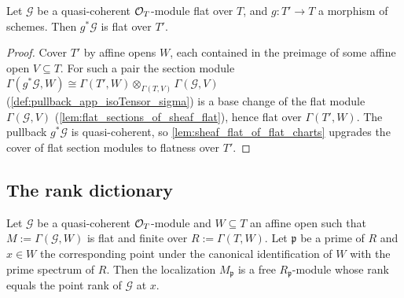 \begin{lemma}
  \label{lem:sheaf_flat_pullback}
  \leanok
  Let \(\mathcal G\) be a quasi-coherent \(\mathcal{O}_T\)-module flat over \(T\),
  and \(g : T' \to T\) a morphism of schemes.  Then \(g^*\mathcal G\) is
  flat over \(T'\).
\end{lemma}

\begin{proof}
  \leanok
  Cover \(T'\) by affine opens \(W\), each contained in the preimage of some
  affine open \(V \subseteq T\).  For such a pair the section module
  \(\Gamma(g^*\mathcal G, W) \cong
    \Gamma(T', W) \otimes_{\Gamma(T, V)} \Gamma(\mathcal G, V)\)
  (\cref{def:pullback_app_isoTensor_sigma}) is a base change of the flat
  module \(\Gamma(\mathcal G, V)\) (\cref{lem:flat_sections_of_sheaf_flat}),
  hence flat over \(\Gamma(T', W)\).  The pullback \(g^*\mathcal G\) is
  quasi-coherent, so \cref{lem:sheaf_flat_of_flat_charts} upgrades the cover
  of flat section modules to flatness over \(T'\).
\end{proof}

\subsection{The rank dictionary}

\begin{theorem}
  \label{thm:stalk_rank_eq_point_rank}
  \leanok
  Let \(\mathcal G\) be a quasi-coherent \(\mathcal{O}_T\)-module and
  \(W \subseteq T\) an affine open such that \(M := \Gamma(\mathcal G, W)\)
  is flat and finite over \(R := \Gamma(T, W)\).  Let \(\mathfrak p\) be a
  prime of \(R\) and \(x \in W\) the corresponding point under the canonical
  identification of \(W\) with the prime spectrum of \(R\).  Then the
  localization \(M_{\mathfrak p}\) is a free \(R_{\mathfrak p}\)-module
  whose rank equals the point rank of \(\mathcal G\) at \(x\).
\end{theorem}

